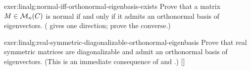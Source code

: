 \begin{exer}{}{exer:linalg:normal-iff-orthonormal-eigenbasis-exists}
  Prove that a matrix $M \in \mathcal{M}_n(C)$ is normal if and only
  if it admits an orthonormal basis of eigenvectors.
  (
  gives one direction; prove the converse.)
\end{exer}
\begin{exer}{\exerused}{exer:linalg:real-symmetric-diagonalizable-orthonormal-eigenbasis}
  Prove that real symmetric matrices are diagonalizable and admit an
  orthonormal basis of eigenvectors. (This is an immediate consequence
  of 
  and
  .)
  []
\end{exer}

